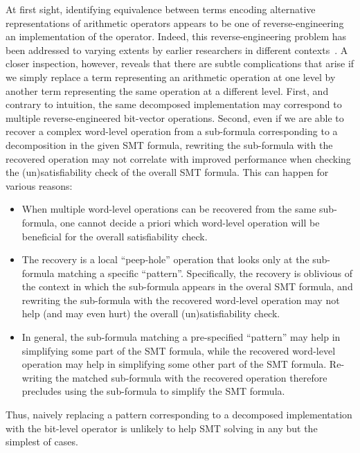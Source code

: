 At first sight, identifying equivalence between terms encoding
alternative representations of arithmetic operators appears to be one
of reverse-engineering an implementation of the operator.  Indeed,
this reverse-engineering problem has been addressed to varying extents
by earlier researchers in different
contexts~\cite{earlier-pat-match-synopsys}.  A closer inspection,
however, reveals that there are subtle complications that arise if we
simply replace a term representing an arithmetic operation at one
level by another term representing the same operation at a different
level. First, and contrary to intuition, the same decomposed
implementation may correspond to multiple reverse-engineered
bit-vector operations.  Second, even if we are able to recover a
complex word-level operation from a sub-formula corresponding to a
decomposition in the given SMT formula, rewriting the sub-formula with
the recovered operation may not correlate with improved performance
when checking the (un)satisfiability check of the overall SMT formula.
This can happen for various reasons:
\begin{itemize}
\item When multiple word-level operations can be recovered from the
  same sub-formula, one cannot decide a priori which word-level
  operation will be beneficial for the overall satisfiability check.
\item The recovery is a local ``peep-hole'' operation that looks only
  at the sub-formula matching a specific ``pattern''.  Specifically,
  the recovery is oblivious of the context in which the sub-formula
  appears in the overal SMT formula, and rewriting the sub-formula
  with the recovered word-level operation may not help (and may even
  hurt) the overall (un)satisfiability check.  
\item In general, the sub-formula matching a pre-specified ``pattern''
  may help in simplifying some part of the SMT formula, while the
  recovered word-level operation may help in simplifying some other
  part of the SMT formula.  Re-writing the matched sub-formula with
  the recovered operation therefore precludes using the sub-formula
  to simplify the SMT formula.
\end{itemize}
Thus, naively replacing a pattern corresponding to a decomposed
implementation with the bit-level operator is unlikely to help SMT
solving in any but the simplest of cases.

